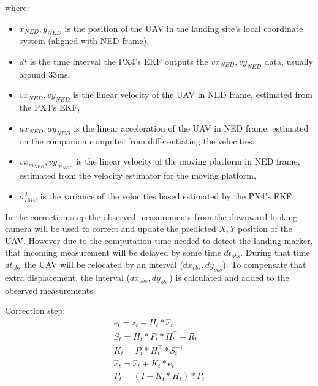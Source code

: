 \documentclass[conference]{IEEEtran}
\begin{document}
where:
\begin{itemize}
\item  \(x_{NED}, y_{NED} \) is the position of the UAV in the landing site's local coordinate system (aligned with NED frame), 
\item \(dt\) is the time interval the PX4's EKF outputs the \(vx_{NED},vy_{NED}\) data, usually around 33ms, 
\item \(vx_{NED},vy_{NED}\) is the linear velocity of the UAV in NED frame, estimated from the PX4's EKF,
\item \(ax_{NED}, ay_{NED}\) is the linear acceleration of the UAV in NED frame, estimated on the companion computer from differentiating the velocities.
\item \(vx_{m_{NED}},vy_{m_{NED}}\) is the linear velocity of the moving platform in NED frame, estimated from the velocity estimator for the moving platform,
\item \(\sigma^{2}_{IMU}\) is the variance of the velocities based estimated by the PX4's EKF.
\end{itemize}

In the correction step the observed measurements from the downward
looking camera will be used to correct and update the predicted
\(X,Y\) position of the UAV. However due to the computation time
needed to detect the landing marker, that incoming measurement will be
delayed by some time \(dt_{obs}\). During that time \(dt_{obs}\) the
UAV will be relocated by an interval (\(dx_{obs},dy_{obs}\)). To
compensate that extra displacement, the interval
(\(dx_{obs},dy_{obs}\)) is calculated and added to the observed
measurements.

Correction step:
\begin{equation}
    \begin{array}{l}
    
    e_{t} = z_{t} - H_{t}*\hat{x}_{t} \\
    S_{t} = H_{t}*P_{t}*H_{t}^\top + R_{t} \\
    K_{t} = P_{t}*H_{t}^\top * S_{t}^{-1} \\
    \hat{x}_{t} = \hat{x}_{t} + K_{t} * e_{t} \\
    P_{t} = (I - K_{t}*H_{t}) * P_{t}
    \end{array}
\end{equation}
\end{document}
